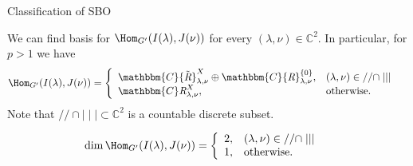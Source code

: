 \documentclass[pdf]{beamer}
\newcommand{\OpR}{\mbox{\it R}}
\theoremstyle{mystyle}
\theoremstyle{remark}
\begin{document}
\begin{frame}{Classification of SBO}
	\begin{theorem}
		We can find basis for $\Hom_{G'}(I(\lambda),J(\nu))$ for every $(\lambda,\nu)\in \mathbb{C}^2$. In particular, for $p>1$ we have
  \begin{eqnarray}
	  & \Hom_{G'}(I(\lambda),J(\nu))= \left\{
    \begin{array}{ll}
	    \mathbbm{C} {\tilde{\OpR}}_{\lambda, \nu}^{X} \oplus \mathbbm{C}
      {\OpR}^{\{ 0 \}}_{\lambda, \nu}, & (\lambda, \nu) \in / /\cap 
      \mid\mid\mid \\
      \mathbbm{C} \OpR^X_{\lambda, \nu}, &
      \mbox{\normalfont otherwise.}
    \end{array} \right. &  \nonumber
  \end{eqnarray}
  Note that $//\cap\mid\mid\mid\subset\mathbb{C}^2$ is a countable discrete subset.
		\label{}
	\end{theorem}
	\begin{corollary}
  \begin{eqnarray}
	  & \dim\Hom_{G'}(I(\lambda),J(\nu))= \left\{
    \begin{array}{ll}
	    2, & (\lambda, \nu) \in / /\cap 
      \mid\mid\mid \\
      1, &
      \mbox{\normalfont otherwise.}
    \end{array} \right. &  \nonumber
  \end{eqnarray}
	\end{corollary}
\end{frame}
\end{document}
